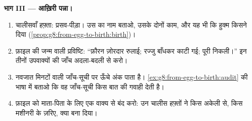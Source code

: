 \begin{problem}[{सप्ताहांत समस्या --- एक गर्भावस्था, मुलाक़ात-दर-मुलाक़ात
देखी हुई}]
\medskip\noindent\textbf{भाग III --- आख़िरी पन्ना।}
\begin{enumerate}[resume]
  \item चालीसवाँ हफ़्ता: प्रसव-पीड़ा। उस  का नाम बताओ, उसके दोनों
        काम, और यह भी कि हुक्म किसने दिया
        (\cref{prop:g8:from-egg-to-birth:birth})।
  \item फ़ाइल की जन्म वाली प्रविष्टि: ``फ़ौरन ज़ोरदार रुलाई; रज्जु
        बाँधकर काटी गई;  पूरी निकली।'' इन तीनों उपवाक्यों की जाँच
        अदला-बदली से करो।
  \item नवजात मिनटों वाली जाँच-सूची पर ऊँचे अंक पाता है।
        \cref{ex:g8:from-egg-to-birth:audit} की भाषा में बताओ कि वह
        जाँच-सूची किस बात की गवाही देती है।
  \item फ़ाइल को माता-पिता के लिए एक वाक्य से बंद करो: उन चालीस
        हफ़्तों ने किस अकेली  से, किस मशीनरी के ज़रिए, क्या बना
        दिया।
\end{enumerate}
\end{problem}
